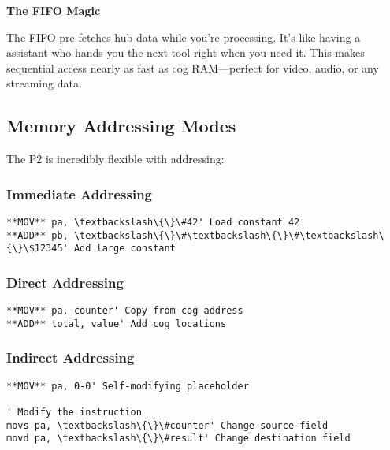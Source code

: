 \documentclass[11pt]{book}
\begin{document}
\begin{interlude}
\textbf{The FIFO Magic}

The FIFO pre-fetches hub data while you're processing. It's like having a assistant who hands you the next tool right when you need it. This makes sequential access nearly as fast as cog RAM—perfect for video, audio, or any streaming data.
\end{interlude}

\hypertarget{memory-addressing-modes}{%
\subsection{Memory Addressing Modes}\label{memory-addressing-modes}}

The P2 is incredibly flexible with addressing:

\hypertarget{immediate-addressing}{%
\subsubsection{Immediate Addressing}\label{immediate-addressing}}

\begin{lstlisting}
**MOV** pa, \textbackslash\{\}\#42' Load constant 42
**ADD** pb, \textbackslash\{\}\#\textbackslash\{\}\#\textbackslash\{\}\$12345' Add large constant
\end{lstlisting}

\hypertarget{direct-addressing}{%
\subsubsection{Direct Addressing}\label{direct-addressing}}

\begin{lstlisting}
**MOV** pa, counter' Copy from cog address
**ADD** total, value' Add cog locations
\end{lstlisting}

\hypertarget{indirect-addressing}{%
\subsubsection{Indirect Addressing}\label{indirect-addressing}}

\begin{lstlisting}
**MOV** pa, 0-0' Self-modifying placeholder
        
' Modify the instruction
movs pa, \textbackslash\{\}\#counter' Change source field
movd pa, \textbackslash\{\}\#result' Change destination field
\end{lstlisting}
\end{document}

